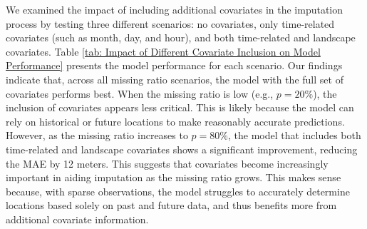 \documentclass[11pt]{article}
\begin{document}
We examined the impact of including additional covariates in the imputation process by testing three different scenarios: no covariates, only time-related covariates (such as month, day, and hour), and both time-related and landscape covariates. Table \ref{tab: Impact of Different Covariate Inclusion on Model Performance} presents the model performance for each scenario. Our findings indicate that, across all missing ratio scenarios, the model with the full set of covariates performs best. When the missing ratio is low (e.g., $p=20\%$), the inclusion of covariates appears less critical. This is likely because the model can rely on historical or future locations to make reasonably accurate predictions. However, as the missing ratio increases to $p=80\%$, the model that includes both time-related and landscape covariates shows a significant improvement, reducing the MAE by 12 meters. This suggests that covariates become increasingly important in aiding imputation as the missing ratio grows. This makes sense because, with sparse observations, the model struggles to accurately determine locations based solely on past and future data, and thus benefits more from additional covariate information.
\end{document}

